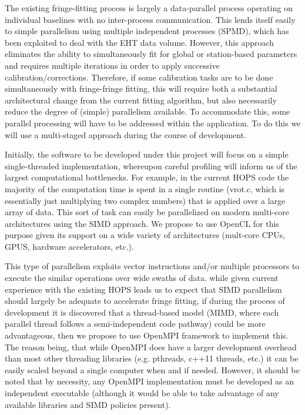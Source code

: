 \documentclass[hidelinks]{article}
\begin{document}
The existing fringe-fitting process is largely a data-parallel process operating on individual baselines with no inter-process
communication. This lends itself easily to simple parallelism using multiple independent processes (SPMD), which has been exploited
\cite{blackburn2019eht} to deal with the EHT data volume. However, this approach eliminates the ability to simultaneously fit for global or station-based
parameters and requires multiple iterations in order to apply successive calibration/corrections. Therefore, if some calibration tasks are to be
done simultaneously with fringe-fringe fitting, this will require both a substantial architectural change from the current fitting algorithm, but
also necessarily reduce the degree of (simple) parallelism available. To accommodate this, some parallel processing will have to be addressed
within the application. To do this we will use a multi-staged approach during the course of development.

Initially, the software to be developed under this project will focus on a simple single-threaded implementation, whereupon careful
profiling will inform us of the largest computational bottlenecks. For example, in the current HOPS code the majority of
the computation time is spent in a single routine (vrot.c, which is essentially just multiplying two complex numbers) that is applied over
a large array of data. This sort of task can easily be parallelized on modern multi-core architectures using the SIMD approach. We propose to use OpenCL
for this purpose given its support on a wide variety of architectures (mult-core CPUs, GPUS, hardware accelerators, etc.).


This type of parallelism exploits vector instructions and/or multiple processors to execute the similar operations over wide swaths of data. while given current experience with the existing HOPS leads us to expect that SIMD parallelism should largely be adequate to accelerate fringe fitting, if during the process of development it is discovered that a thread-based model (MIMD, where each parallel thread follows a semi-independent code pathway) could be more advantageous, then we propose to use OpenMPI framework to implement this. The reason being, that while OpenMPI does have a larger development overhead than most other threading libraries (e.g. pthreads, c++11 threads, etc.) it can be easily scaled beyond a single computer when and if needed. However, it should be noted that by necessity, any OpenMPI implementation must be developed as an independent executable (although it would be able to take advantage of any available libraries and SIMD policies present).
\end{document}
